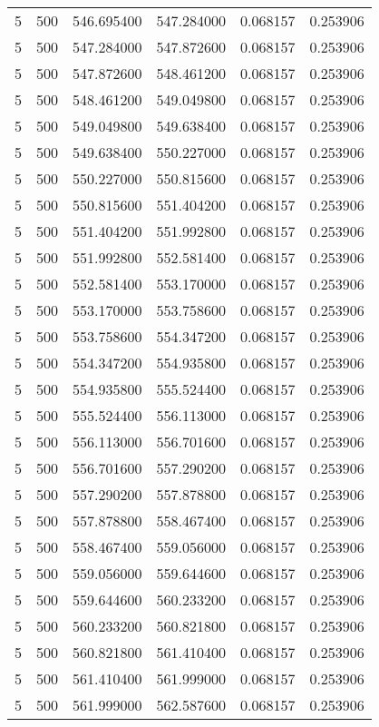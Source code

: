 \begin{longtable}{rrrrrr}
5 & 500 & 546.695400 & 547.284000 & 0.068157 & 0.253906 \\
5 & 500 & 547.284000 & 547.872600 & 0.068157 & 0.253906 \\
5 & 500 & 547.872600 & 548.461200 & 0.068157 & 0.253906 \\
5 & 500 & 548.461200 & 549.049800 & 0.068157 & 0.253906 \\
5 & 500 & 549.049800 & 549.638400 & 0.068157 & 0.253906 \\
5 & 500 & 549.638400 & 550.227000 & 0.068157 & 0.253906 \\
5 & 500 & 550.227000 & 550.815600 & 0.068157 & 0.253906 \\
5 & 500 & 550.815600 & 551.404200 & 0.068157 & 0.253906 \\
5 & 500 & 551.404200 & 551.992800 & 0.068157 & 0.253906 \\
5 & 500 & 551.992800 & 552.581400 & 0.068157 & 0.253906 \\
5 & 500 & 552.581400 & 553.170000 & 0.068157 & 0.253906 \\
5 & 500 & 553.170000 & 553.758600 & 0.068157 & 0.253906 \\
5 & 500 & 553.758600 & 554.347200 & 0.068157 & 0.253906 \\
5 & 500 & 554.347200 & 554.935800 & 0.068157 & 0.253906 \\
5 & 500 & 554.935800 & 555.524400 & 0.068157 & 0.253906 \\
5 & 500 & 555.524400 & 556.113000 & 0.068157 & 0.253906 \\
5 & 500 & 556.113000 & 556.701600 & 0.068157 & 0.253906 \\
5 & 500 & 556.701600 & 557.290200 & 0.068157 & 0.253906 \\
5 & 500 & 557.290200 & 557.878800 & 0.068157 & 0.253906 \\
5 & 500 & 557.878800 & 558.467400 & 0.068157 & 0.253906 \\
5 & 500 & 558.467400 & 559.056000 & 0.068157 & 0.253906 \\
5 & 500 & 559.056000 & 559.644600 & 0.068157 & 0.253906 \\
5 & 500 & 559.644600 & 560.233200 & 0.068157 & 0.253906 \\
5 & 500 & 560.233200 & 560.821800 & 0.068157 & 0.253906 \\
5 & 500 & 560.821800 & 561.410400 & 0.068157 & 0.253906 \\
5 & 500 & 561.410400 & 561.999000 & 0.068157 & 0.253906 \\
5 & 500 & 561.999000 & 562.587600 & 0.068157 & 0.253906 \\

\end{longtable}
